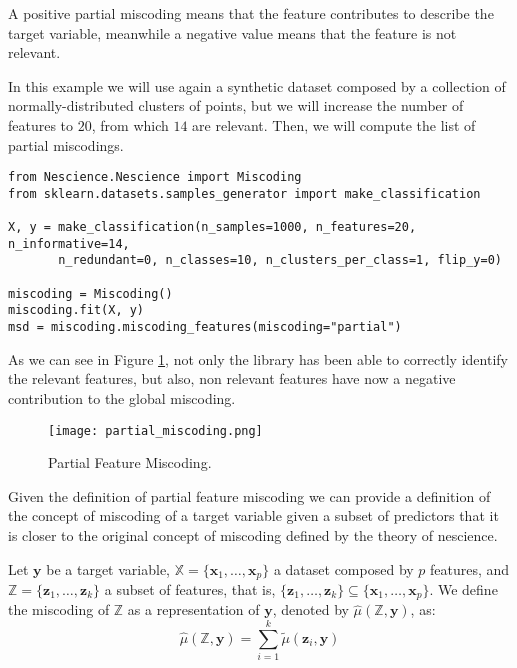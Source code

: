 A positive partial miscoding means that the feature contributes to describe the target variable, meanwhile a negative value means that the feature is not relevant.

\begin{example}
\label{example:partial_feature_miscoding}
In this example we will use again a synthetic dataset composed by a collection of normally-distributed clusters of points, but we will increase the number of features to $20$, from which $14$ are relevant. Then, we will compute the list of partial miscodings.

\begin{sourcecode}
{\scriptsize \begin{verbatim}
from Nescience.Nescience import Miscoding
from sklearn.datasets.samples_generator import make_classification

X, y = make_classification(n_samples=1000, n_features=20, n_informative=14,
       n_redundant=0, n_classes=10, n_clusters_per_class=1, flip_y=0)

miscoding = Miscoding()
miscoding.fit(X, y)
msd = miscoding.miscoding_features(miscoding="partial")
\end{verbatim}}
\end{sourcecode}

As we can see in Figure \ref{figure:partial_feature_miscoding}, not only the library has been able to correctly identify the relevant features, but also, non relevant features have now a negative contribution to the global miscoding.

\begin{figure}[h]
\centering
\texttt{[image: partial\_miscoding.png]}
\caption{Partial Feature Miscoding.}
\label{figure:partial_feature_miscoding}
\end{figure}

\end{example}

Given the definition of partial feature miscoding we can provide a definition of the concept of miscoding of a target variable given a subset of predictors that it is closer to the original concept of miscoding defined by the theory of nescience.

\begin{definition}
Let $\mathbf{y}$ be a target variable, $\mathbb{X} = \{ \mathbf{x}_1, \ldots, \mathbf{x}_p \}$ a dataset composed by $p$ features, and $\mathbb{Z} = \{ \mathbf{z}_1, \ldots, \mathbf{z}_k \}$ a subset of features, that is, $\{ \mathbf{z}_1, \ldots, \mathbf{z}_k \} \subseteq \{ \mathbf{x}_1, \ldots, \mathbf{x}_p \}$. We define the miscoding of $\mathbb{Z}$ as a representation of $\mathbf{y}$, denoted by $\hat\mu(\mathbb{Z}, \mathbf{y})$, as:
\[
\hat\mu(\mathbb{Z}, \mathbf{y}) = \sum_{i=1}^k \tilde\mu (\mathbf{z}_i, \mathbf{y})
\]
\end{definition}

